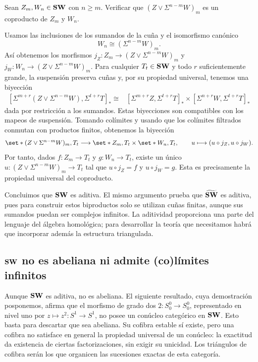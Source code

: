 \begin{ejer}
Sean $Z_m,W_n\in\mathbf{SW}$ con $n\geq m$. Verificar que $(Z\vee\Sigma^{n-m}W)_m$ es un coproducto de $Z_m$ y $W_n$.
\end{ejer}
\begin{sol}
Usamos las inclusiones de los sumandos de la cuña y el isomorfismo canónico
\[
W_n\cong(\Sigma^{n-m}W)_m.
\]
Así obtenemos los morfismos $j_Z\colon Z_m\to (Z\vee\Sigma^{n-m}W)_m$ y $j_W\colon W_n\to (Z\vee\Sigma^{n-m}W)_m$. Para cualquier $T_t\in\mathbf{SW}$ y todo $r$ suficientemente grande, la suspensión preserva cuñas y, por su propiedad universal, tenemos una biyección
\[
\begin{aligned}
[\Sigma^{m+r}(Z\vee\Sigma^{n-m}W),\Sigma^{t+r}T]_*
\cong{}&[\Sigma^{m+r}Z,\Sigma^{t+r}T]_*\times[\Sigma^{n+r}W,\Sigma^{t+r}T]_*
\end{aligned}
\]
dada por restricción a los sumandos. Estas biyecciones son compatibles con los mapeos de suspensión. Tomando colímites y usando que los colímites filtrados conmutan con productos finitos, obtenemos la biyección
\[
\set*{(Z\vee\Sigma^{n-m}W)_m,T_t}\longrightarrow
\set*{Z_m,T_t}\times\set*{W_n,T_t},
\qquad
u\longmapsto(u\circ j_Z,u\circ j_W).
\]
Por tanto, dados $f\colon Z_m\to T_t$ y $g\colon W_n\to T_t$, existe un único $u\colon (Z\vee\Sigma^{n-m}W)_m\to T_t$ tal que $u\circ j_Z=f$ y $u\circ j_W=g$. Esta es precisamente la propiedad universal del coproducto.
\end{sol}

Concluimos que $\mathbf{SW}$ es aditiva. El mismo argumento prueba que $\widetilde{\mathbf{SW}}$ es aditiva, pues para construir estos biproductos solo se utilizan cuñas finitas, aunque sus sumandos puedan ser complejos infinitos. La aditividad proporciona una parte del lenguaje del álgebra homológica; para desarrollar la teoría que necesitamos habrá que incorporar además la estructura triangulada.

\subsection{\texorpdfstring{$\mathbf{SW}$}{SW} no es abeliana ni admite (co)límites infinitos}
Aunque $\mathbf{SW}$ es aditiva, no es abeliana. El siguiente resultado, cuya demostración posponemos, afirma que el morfismo de grado dos $2\colon S^0_0\to S^0_0$, representado en nivel uno por $z\mapsto z^2\colon S^1\to S^1$, no posee un conúcleo categórico en $\mathbf{SW}$. Esto basta para descartar que sea abeliana. Su cofibra estable sí existe, pero una cofibra no satisface en general la propiedad universal de un conúcleo: la exactitud da existencia de ciertas factorizaciones, sin exigir su unicidad. Los triángulos de cofibra serán los que organicen las sucesiones exactas de esta categoría.

